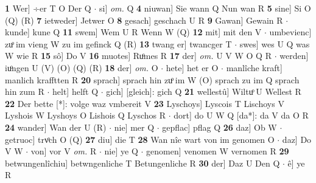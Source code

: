 \documentclass[8pt,a4paper,notitlepage]{article}
\begin{document}
\begin{table}[ht]
\begin{minipage}[t]{0.5\linewidth}
\textbf{1} Wer] ÷er T O Der Q  $\cdot$ si] \textit{om.} Q \textbf{4} niuwan] Sie wann Q Nun wan R \textbf{5} sine] Si O (Q) (R) \textbf{7} ietweder] Jetwer O \textbf{8} gesach] geschach U R \textbf{9} Gawan] Gewain R  $\cdot$ kunde] kune Q \textbf{11} swem] Wem U R Wenn W (Q) \textbf{12} mit] mit den V  $\cdot$ umbevienc] zuͦ im vieng W zu im gefinck Q (R) \textbf{13} twang er] twancger T  $\cdot$ swes] wes U Q was W wie R \textbf{15} sô] Do V \textbf{16} muotes] Ruͦmes R \textbf{17} der] \textit{om.} U V W O Q R  $\cdot$ werden] iuͦngen U (V) (O) (Q) (R) \textbf{18} der] \textit{om.} O  $\cdot$ hete] het er O  $\cdot$ manlîche kraft] manlich krafftten R \textbf{20} sprach] sprach hin zuͦ im W (O) sprach zu im Q sprach hin zum R  $\cdot$ helt] helft Q  $\cdot$ gich] [gleich]: gich Q \textbf{21} wellestû] Wiltuͦ U Wellest R \textbf{22} Der bette [*]: volge waz vmbereit V \textbf{23} Lyschoys] Lyscois T Lischoys V Lyshois W Lyshoys O Lishois Q Lyschos R  $\cdot$ dort] do U W Q [da*]: da V da O R \textbf{24} wander] Wan der U (R)  $\cdot$ nie] mer Q  $\cdot$ gepflac] pflag Q \textbf{26} daz] Ob W  $\cdot$ getruoc] trvͦch O (Q) \textbf{27} diu] die T \textbf{28} Wan nîe wart von im genomen O  $\cdot$ daz] Do V W  $\cdot$ von] vor V \textit{om.} R  $\cdot$ nie] ye Q  $\cdot$ genomen] venomen W vernomen R \textbf{29} betwungenlîchiu] betwngenliche T Betungenliche R \textbf{30} der] Daz U Den Q  $\cdot$ ê] ye R \newline
\end{minipage}
\end{table}
\end{document}
